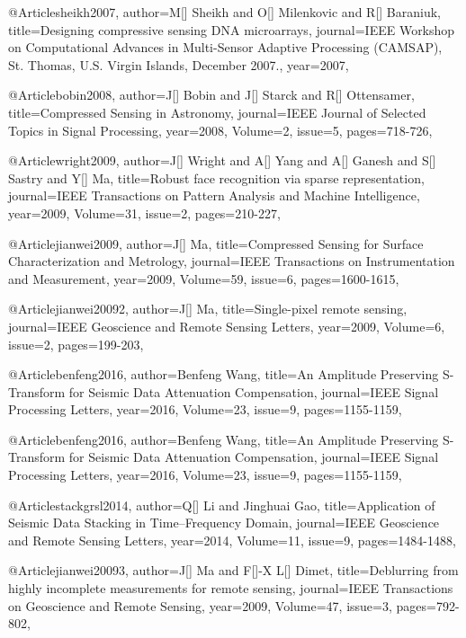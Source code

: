 {@Article{sheikh2007,
  author={M[] Sheikh and O[] Milenkovic and R[] Baraniuk},
  title={Designing compressive sensing DNA microarrays},
  journal={IEEE Workshop on Computational Advances in Multi-Sensor Adaptive
Processing (CAMSAP), St. Thomas, U.S. Virgin Islands, December 2007.},
  year=2007,
}

@Article{bobin2008,
  author={J[] Bobin and J[] Starck and R[] Ottensamer},
  title={Compressed Sensing in Astronomy},
  journal={IEEE Journal of Selected Topics in Signal Processing},
  year=2008,
  Volume=2,
  issue=5,
  pages={718-726},
}

@Article{wright2009,
  author={J[] Wright and A[] Yang and A[] Ganesh and S[] Sastry and Y[] Ma},
  title={Robust face recognition via sparse representation},
  journal={IEEE Transactions on Pattern Analysis and Machine Intelligence},
  year=2009,
  Volume=31,
  issue=2,
  pages={210-227},
}

@Article{jianwei2009,
  author={J[] Ma},
  title={Compressed Sensing for Surface Characterization and Metrology},
  journal={IEEE Transactions on Instrumentation and Measurement},
  year=2009,
  Volume=59,
  issue=6,
  pages={1600-1615},
}

@Article{jianwei20092,
  author={J[] Ma},
  title={Single-pixel remote sensing},
  journal={IEEE Geoscience and Remote Sensing Letters},
  year=2009,
  Volume=6,
  issue=2,
  pages={199-203},
}

@Article{benfeng2016,
  author={Benfeng Wang},
  title={An Amplitude Preserving S-Transform for Seismic Data Attenuation Compensation},
  journal={IEEE Signal Processing Letters},
  year=2016,
  Volume=23,
  issue=9,
  pages={1155-1159},
}

@Article{benfeng2016,
  author={Benfeng Wang},
  title={An Amplitude Preserving S-Transform for Seismic Data Attenuation Compensation},
  journal={IEEE Signal Processing Letters},
  year=2016,
  Volume=23,
  issue=9,
  pages={1155-1159},
}


 @Article{stackgrsl2014,
  author={Q[] Li and Jinghuai Gao},
  title={Application of Seismic Data Stacking in Time–Frequency Domain},
  journal={IEEE Geoscience and Remote Sensing Letters},
  year=2014,
  Volume=11,
  issue=9,
  pages={1484-1488},
}





@Article{jianwei20093,
  author={J[] Ma and F[]-X L[] Dimet},
  title={Deblurring from highly incomplete measurements for remote sensing},
  journal={IEEE Transactions on Geoscience and Remote Sensing},
  year=2009,
  Volume=47,
  issue=3,
  pages={792-802},
}

}

